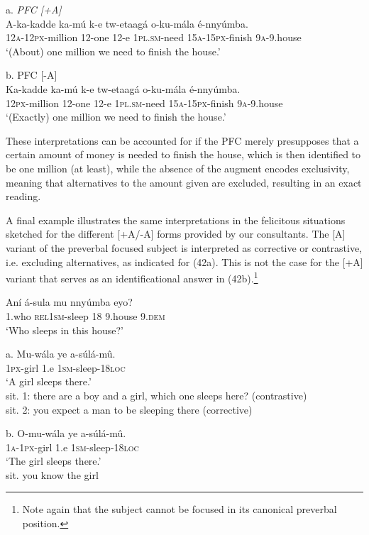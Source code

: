 \documentclass[output=paper]{langsci/langscibook}
\begin{document}
\ea
{a.  \textit{PFC [+A]}}\\
\gll A-ka-kadde  ka-mú  k-e  tw-etaagá  o-ku-mála    é-nnyúmba.\\
     \textsc{12a}-\textsc{12px}-million  12-one  12-e  \textsc{1pl}.\textsc{sm}-need  \textsc{15a}-\textsc{15px}-finish  \textsc{9a}-9.house\\
\glt ‘(About) one million we need to finish the house.’
\z

\ea
{b.  PFC [-A]}\\
\gll Ka-kadde    ka-mú  k-e  tw-etaagá  o-ku-mála    é-nnyúmba.\\
     \textsc{12px}-million  12-one  12-e  \textsc{1pl}.\textsc{sm}-need  \textsc{15a}-\textsc{15px}-finish  \textsc{9a}-9.house\\
\glt ‘(Exactly) one million we need to finish the house.’
\z

These interpretations can be accounted for if the PFC merely presupposes that a certain amount of money is needed to finish the house, which is then identified to be one million (at least), while the absence of the augment encodes exclusivity, meaning that alternatives to the amount given are excluded, resulting in an exact reading.

A final example illustrates the same interpretations in the felicitous situations sketched for the different [+A/-A] forms provided by our consultants. The [A] variant of the preverbal focused subject is interpreted as corrective or contrastive, i.e. excluding alternatives, as indicated for (42a). This is not the case for the [+A] variant that serves as an identificational answer in (42b).\footnote{Note again that the subject cannot be focused in its canonical preverbal position.}

\ea
\gll   Aní  á-sula      mu  nnyúmba  eyo?\\
       1.who  \textsc{rel1sm}-sleep  18  9.house  9.\textsc{dem}\\
\glt   ‘Who sleeps in this house?’
\z

\ea
\gll   a.  Mu-wála  ye  a-súlá-mû.\\
         \textsc{1px}-girl  1.e  \textsc{1sm}-sleep-\textsc{18loc}\\
\glt ‘A girl sleeps there.’\\
sit. 1: there are a boy and a girl, which one sleeps here? (contrastive)\\
sit. 2: you expect a man to be sleeping there (corrective)
\z

\ea
\gll   b.  O-mu-wála  ye  a-súlá-mû.\\
         \textsc{1a}-\textsc{1px}-girl  1.e  \textsc{1sm}-sleep-\textsc{18loc}\\
\glt ‘The girl sleeps there.’\\
sit. you know the girl
\z
\end{document}
